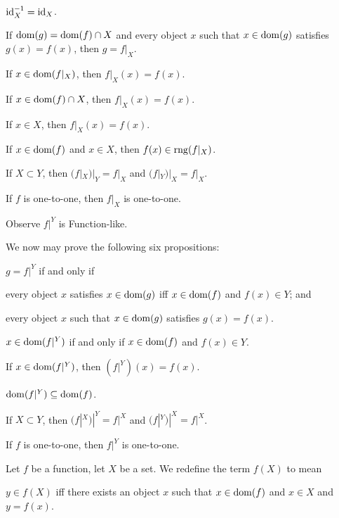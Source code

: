 \documentclass{article}
\begin{document}
\begin{thm}
\item\label{funct1:45} $\operatorname{id}_{X}^{-1}=\operatorname{id}_{X}$.
\item\label{funct1:46} If $\operatorname{dom}(g)=\operatorname{dom}(f)\cap X$ and every object $x$
  such that $x\in\operatorname{dom}(g)$ satisfies $g(x)=f(x)$, then $g=f|_{X}$.
\item\label{funct1:47} If $x\in\operatorname{dom}(f|_{X})$, then $f|_{X}(x)=f(x)$.
\item\label{funct1:48} If $x\in\operatorname{dom}(f)\cap X$, then $f|_{X}(x)=f(x)$.
\item\label{funct1:49} If $x\in X$, then $f|_{X}(x)=f(x)$.
\item\label{funct1:50} If $x\in\operatorname{dom}(f)$ and $x\in X$, then $f(x)\in\operatorname{rng}(f|_{X})$.
\item\label{funct1:51} If $X\subset Y$, then $(f|_{X})|_{Y}=f|_{X}$ and $(f|_{Y})|_{X}=f|_{X}$.
\item\label{funct1:52} If $f$ is one-to-one, then $f|_{X}$ is one-to-one.
\end{thm}

Observe $f|^{Y}$ is Function-like.

We now may prove the following six propositions:
\begin{thm}
\item\label{funct1:53} $g=f|^{Y}$ if and only if
  \begin{enumerate*}[label=(\roman*)]
  \item every object $x$ satisfies $x\in\operatorname{dom}(g)$ iff $x\in\operatorname{dom}(f)$ and
    $f(x)\in Y$; and
  \item every object $x$ such that $x\in\operatorname{dom}(g)$ satisfies $g(x)=f(x)$.
  \end{enumerate*}
\item\label{funct1:54} $x\in\operatorname{dom}(f|^{Y})$ if and only if $x\in\operatorname{dom}(f)$
  and $f(x)\in Y$.
\item\label{funct1:55} If $x\in\operatorname{dom}(f|^{Y})$, then $(f|^{Y})(x)=f(x)$.
\item\label{funct1:56} $\operatorname{dom}(f|^{Y})\subseteq\operatorname{dom}(f)$.
\item\label{funct1:57} If $X\subset Y$, then $(f|^{X})|^{Y}=f|^{X}$ and $(f|^{Y})|^{X}=f|^{X}$.
\item\label{funct1:58} If $f$ is one-to-one, then $f|^{Y}$ is one-to-one.
\end{thm}

\begin{definition}
Let $f$ be a function, let $X$ be a set.
We redefine the term $f(X)$ to mean
\begin{defn}
\item $y\in f(X)$ iff there exists an object $x$ such that $x\in\operatorname{dom}(f)$
  and $x\in X$ and $y=f(x)$.
\end{defn}
\end{definition}
\end{document}
